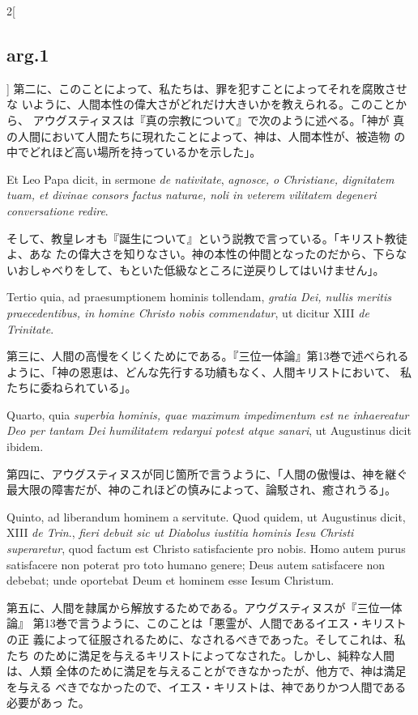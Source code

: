 \documentclass[paper=a4paper,fontsize=10pt,jafontsize=9pt,titlepage]{jlreq}
\begin{document}
\begin{paracol}{2}[\subsection{arg.1}]
第二に、このことによって、私たちは、罪を犯すことによってそれを腐敗させな
 いように、人間本性の偉大さがどれだけ大きいかを教えられる。このことから、
 アウグスティヌスは『真の宗教について』で次のように述べる。「神が
 真の人間において人間たちに現れたことによって、神は、人間本性が、被造物
 の中でどれほど高い場所を持っているかを示した」。

\switchcolumn*

Et Leo Papa dicit, in sermone {\itshape de
 nativitate}, {\itshape agnosce, o Christiane, dignitatem tuam, et divinae consors
 factus naturae, noli in veterem vilitatem degeneri conversatione
 redire}.

\switchcolumn

そして、教皇レオも『誕生について』という説教で言っている。「キリスト教徒よ、あな
 たの偉大さを知りなさい。神の本性の仲間となったのだから、下らな
 いおしゃべりをして、もといた低級なところに逆戻りしてはいけません」。

\switchcolumn*

Tertio quia, ad praesumptionem hominis tollendam, {\itshape gratia Dei,
 nullis meritis praecedentibus, in homine Christo nobis commendatur}, ut
 dicitur XIII {\itshape de Trinitate}.

\switchcolumn

第三に、人間の高慢をくじくためにである。『三位一体論』第13巻で述べられる
 ように、「神の恩恵は、どんな先行する功績もなく、人間キリストにおいて、
 私たちに委ねられている」。

\switchcolumn*

Quarto, quia {\itshape superbia hominis, quae maximum
 impedimentum est ne inhaereatur Deo per tantam Dei humilitatem redargui
 potest atque sanari}, ut Augustinus dicit ibidem.

\switchcolumn

第四に、アウグスティヌスが同じ箇所で言うように、「人間の傲慢は、神を継ぐ
 最大限の障害だが、神のこれほどの慎みによって、論駁され、癒されうる」。

\switchcolumn*

Quinto, ad liberandum
 hominem a servitute. Quod quidem, ut Augustinus dicit, XIII {\itshape de Trin}.,
 {\itshape fieri debuit sic ut Diabolus iustitia hominis Iesu Christi superaretur},
 quod factum est Christo satisfaciente pro nobis. Homo autem purus
 satisfacere non poterat pro toto humano genere; Deus autem satisfacere
 non debebat; unde oportebat Deum et hominem esse Iesum Christum.

\switchcolumn

第五に、人間を隷属から解放するためである。アウグスティヌスが『三位一体論』
 第13巻で言うように、このことは「悪霊が、人間であるイエス・キリストの正
 義によって征服されるために、なされるべきであった。そしてこれは、私たち
のために満足を与えるキリストによってなされた。しかし、純粋な人間は、人類
 全体のために満足を与えることができなかったが、他方で、神は満足を与える
 べきでなかったので、イエス・キリストは、神でありかつ人間である必要があっ
 た。


\end{paracol}
\end{document}
